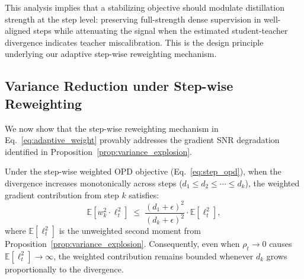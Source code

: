This analysis implies that a stabilizing objective should modulate distillation strength at the step level: preserving full-strength dense supervision in well-aligned steps while attenuating the signal when the estimated student-teacher divergence indicates teacher miscalibration. This is the design principle underlying our adaptive step-wise reweighting mechanism.















\subsection{Variance Reduction under Step-wise Reweighting}
\label{app:variance_reduction}

We now show that the step-wise reweighting mechanism in Eq.~\eqref{eq:adaptive_weight} provably addresses the gradient SNR degradation identified in Proposition~\ref{prop:variance_explosion}.

\begin{proposition}
\label{prop:variance_reduction}
Under the step-wise weighted OPD objective (Eq.~\ref{eq:step_opd}), when the divergence increases monotonically across steps ($d_1 \le d_2 \le \cdots \le d_k$), the weighted gradient contribution from step $k$ satisfies:
\begin{equation}
    \mathbb{E}[w_k^2 \cdot \ell_t^2] \;\le\; \frac{(d_1 + \epsilon)^2}{(d_k + \epsilon)^2} \cdot \mathbb{E}[\ell_t^2],
\end{equation}
where $\mathbb{E}[\ell_t^2]$ is the unweighted second moment from Proposition~\ref{prop:variance_explosion}. Consequently, even when $\rho_t \to 0$ causes $\mathbb{E}[\ell_t^2] \to \infty$, the weighted contribution remains bounded whenever $d_k$ grows proportionally to the divergence.
\end{proposition}

